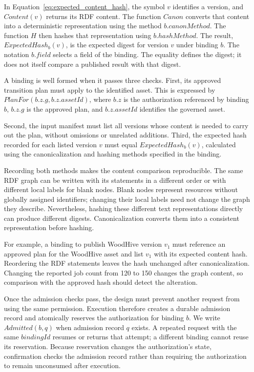 \documentclass[journal]{IEEEtran}
\begin{document}
In Equation~\ref{eq:expected_content_hash}, the symbol $v$ identifies a version, and $Content(v)$ returns its
RDF content. The function $Canon$ converts that content into a
deterministic representation using the method $b.canonMethod$.
The function $H$ then hashes that representation using
$b.hashMethod$. The result, $ExpectedHash_b(v)$, is the expected
digest for version $v$ under binding $b$. The notation $b.field$
selects a field of the binding. The equality defines the digest;
it does not itself compare a published result with that digest.

A binding is well formed when it passes three checks.
First, its approved transition plan must apply to the
identified asset. This is expressed by
$PlanFor(b.z.g,b.z.assetId)$, where $b.z$ is the authorization
referenced by binding $b$, $b.z.g$ is the approved plan,
and $b.z.assetId$ identifies the governed asset.

Second, the input manifest must list all versions whose
content is needed to carry out the plan, without omissions
or unrelated additions. Third, the expected hash recorded
for each listed version $v$ must equal $ExpectedHash_b(v)$,
calculated using the canonicalization and hashing methods
specified in the binding.

Recording both methods makes the content comparison
reproducible. The same RDF graph can be written with its
statements in a different order or with different local
labels for blank nodes. Blank nodes represent resources
without globally assigned identifiers; changing their local
labels need not change the graph they describe. Nevertheless,
hashing these different text representations directly can
produce different digests. Canonicalization converts them
into a consistent representation before hashing.

For example, a binding to publish WoodHive version $v_1$
must reference an approved plan for the WoodHive asset and
list $v_1$ with its expected content hash. Reordering the
RDF statements leaves the hash unchanged after
canonicalization. Changing the reported job count from
120 to 150 changes the graph content, so comparison with
the approved hash should detect the alteration.

Once the admission checks pass, the design must prevent another request
from using the same permission. Execution therefore creates a durable
admission record and atomically reserves the authorization for binding
$b$. We write $Admitted(b,q)$ when admission record $q$ exists.
A repeated request with the same $bindingId$ resumes or returns that
attempt; a different binding cannot reuse its reservation. Because
reservation changes the authorization's state, confirmation checks the
admission record rather than requiring the authorization to remain
unconsumed after execution.
\end{document}

